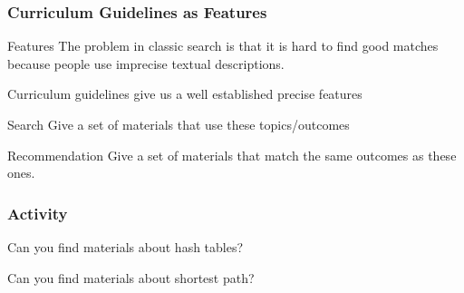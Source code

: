 \documentclass[aspectratio=169]{beamer}
\begin{document}
\begin{frame}
  \frametitle{Curriculum Guidelines as Features}

  \begin{block}{Features}
    The problem in classic search is that it is hard to find good
    matches because people use imprecise textual descriptions.

    Curriculum guidelines give us a well established precise features
  \end{block}

  \begin{block}{Search}
    Give a set of materials that use these topics/outcomes
  \end{block}

  \begin{block}{Recommendation}
    Give a set of materials that match the same outcomes as these ones.
  \end{block}
  
\end{frame}

\begin{frame}
  \frametitle{Activity}

  Can you find materials about hash tables?

  Can you find materials about shortest path?
\end{frame}
\end{document}
